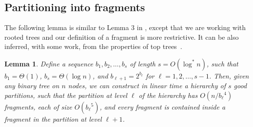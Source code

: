 \documentclass[11pt,a4paper]{article}
\newtheorem{lemma}{Lemma}
\theoremstyle{definition}
\theoremstyle{remark}
\begin{document}
\subsection{Partitioning into fragments}\label{section:partioioning}
The following lemma is similar to Lemma 3 in \cite{Frederickson1985}, except that we are working with rooted trees
and our definition of a fragment is more restrictive. It can be also inferred, with some work, from the properties of top trees~\cite{TopTrees}.

\begin{lemma}\label{good partition refinement lemma}
Define a sequence $b_{1},b_{2},\ldots,b_{s}$ of length $s=O(\log^{*}n)$, such that $b_{1}=\Theta(1)$, $b_{s} = \Theta(\log n)$,
and $b_{\ell+1} = 2^{b_{\ell}}$ for $\ell=1,2,\ldots,s-1$. Then, given any binary tree on $n$ nodes,
we can construct in linear time a hierarchy of $s$ good partitions, such that 
the partition at level $\ell$ of the hierarchy has $O(n/{{b_{\ell}}^4})$ fragments, each of size $O({b_{\ell}}^5)$,
and every fragment is contained inside a fragment in the partition at level $\ell+1$.
\end{lemma}
\end{document}
